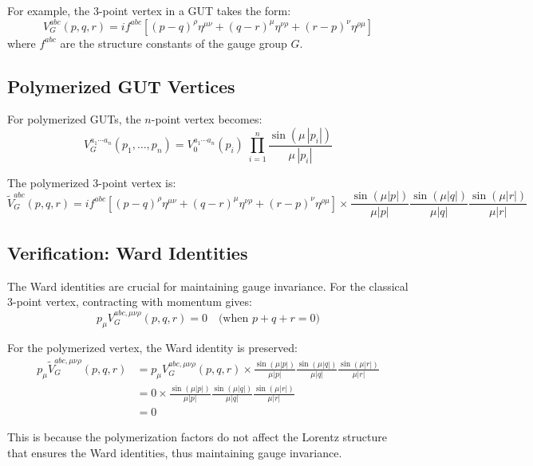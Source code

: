 \documentclass[11pt]{article}
\begin{document}
For example, the 3-point vertex in a GUT takes the form:
\begin{equation}
    V_G^{abc}(p,q,r) = if^{abc}[(p-q)^\rho \eta^{\mu\nu} + (q-r)^\mu \eta^{\nu\rho} + (r-p)^\nu \eta^{\rho\mu}]
\end{equation}
where $f^{abc}$ are the structure constants of the gauge group $G$.

\subsection{Polymerized GUT Vertices}
For polymerized GUTs, the $n$-point vertex becomes:
\begin{equation}
    \boxed{
    V_G^{a_1\cdots a_n}(p_1,\ldots,p_n) = V_{0}^{a_1\cdots a_n}(p_i)\;\prod_{i=1}^n \frac{\sin(\mu\,|p_i|)}{\mu\,|p_i|}
    }
\end{equation}

The polymerized 3-point vertex is:
\begin{equation}
    \widetilde{V}_G^{abc}(p,q,r) = if^{abc}[(p-q)^\rho \eta^{\mu\nu} + (q-r)^\mu \eta^{\nu\rho} + (r-p)^\nu \eta^{\rho\mu}] \times \frac{\sin(\mu|p|)}{\mu|p|}\frac{\sin(\mu|q|)}{\mu|q|}\frac{\sin(\mu|r|)}{\mu|r|}
\end{equation}

\subsection{Verification: Ward Identities}
The Ward identities are crucial for maintaining gauge invariance. For the classical 3-point vertex, contracting with momentum gives:
\begin{equation}
    p_\mu V_G^{abc,\mu\nu\rho}(p,q,r) = 0 \quad \text{(when $p+q+r=0$)}
\end{equation}

For the polymerized vertex, the Ward identity is preserved:
\begin{equation}
\begin{aligned}
    p_\mu \widetilde{V}_G^{abc,\mu\nu\rho}(p,q,r) &= p_\mu V_G^{abc,\mu\nu\rho}(p,q,r) \times \frac{\sin(\mu|p|)}{\mu|p|}\frac{\sin(\mu|q|)}{\mu|q|}\frac{\sin(\mu|r|)}{\mu|r|} \\
    &= 0 \times \frac{\sin(\mu|p|)}{\mu|p|}\frac{\sin(\mu|q|)}{\mu|q|}\frac{\sin(\mu|r|)}{\mu|r|} \\
    &= 0
\end{aligned}
\end{equation}

This is because the polymerization factors do not affect the Lorentz structure that ensures the Ward identities, thus maintaining gauge invariance.
\end{document}
